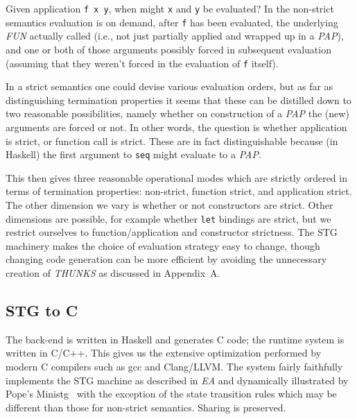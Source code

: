 \documentclass{llncs}
\begin{document}
Given application \texttt{f x y}, when might \texttt{x} and \texttt{y} be
evaluated?  In the non-strict semantics evaluation is on demand, after
\texttt{f} has been evaluated, the underlying \emph{FUN} actually called
(i.e., not just partially applied and wrapped up in a \emph{PAP}), and one or
both of those arguments possibly forced in subsequent evaluation (assuming
that they weren't forced in the evaluation of \texttt{f} itself).

In a strict semantics one could devise various evaluation orders, but as far
as distinguishing termination properties it seems that these can be distilled
down to two reasonable possibilities, namely whether on construction of a
\emph{PAP} the (new) arguments are forced or not.  In other words, the
question is whether application is strict, or function call is strict.  These
are in fact distinguishable because (in Haskell) the first argument to
\texttt{seq} might evaluate to a \emph{PAP}.

This then gives three reasonable operational modes which are strictly ordered
in terms of termination properties: 
non-strict, function strict, and application strict.
The other dimension we vary is whether or not constructors are strict.  Other
dimensions are possible, for example whether \texttt{let} bindings are strict,
but we restrict ourselves to function/application and constructor strictness.
The STG machinery makes the choice of evaluation strategy easy to change,
though changing code generation can be more efficient by avoiding the
unnecessary creation of \emph{THUNKS} as discussed in Appendix~A.


\subsection{STG to C}
The back-end is written in Haskell and generates C code; the runtime system is
written in C/C++. This gives us the extensive optimization performed by modern
C compilers such as gcc and Clang/LLVM. The system fairly faithfully
implements the STG machine as described in \emph{EA} and dynamically
illustrated by Pope's Ministg~\cite{ministg} with the exception of the state
transition rules which may be different than those for non-strict semantics.
Sharing is preserved.
\end{document}
